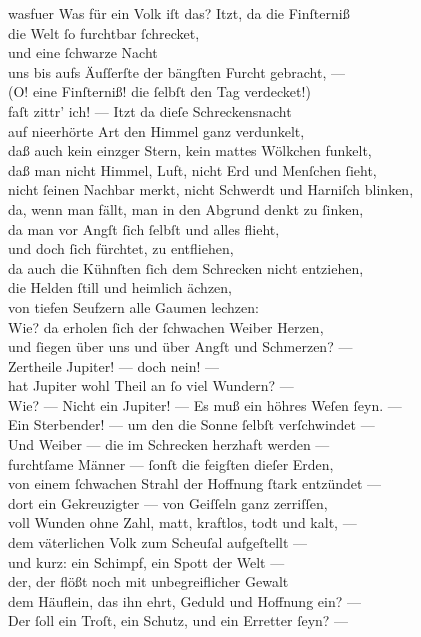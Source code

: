 \documentclass[shorttitlesize=50,tocstyle=ref-genre]{ees}
\begin{document}
{  \begin{movement}{wasfuer}
    Was für ein Volk iſt das? Itzt, da die Finſterniß\\
    die Welt ſo furchtbar ſchrecket,\\
    und eine ſchwarze Nacht\\
    uns bis aufs Äuſſerſte der bängſten Furcht gebracht, —\\
    (O! eine Finſterniß! die ſelbſt den Tag verdecket!)\\
    faſt zittr’ ich! — Itzt da dieſe Schreckensnacht\\
    auf nieerhörte Art den Himmel ganz verdunkelt,\\
    daß auch kein einzger Stern, kein mattes Wölkchen funkelt,\\
    daß man nicht Himmel, Luft, nicht Erd und Menſchen ſieht,\\
    nicht ſeinen Nachbar merkt, nicht Schwerdt und Harniſch blinken,\\
    da, wenn man fällt, man in den Abgrund denkt zu ſinken,\\
    da man vor Angſt ſich ſelbſt und alles flieht,\\
    und doch ſich fürchtet, zu entfliehen,\\
    da auch die Kühnſten ſich dem Schrecken nicht entziehen,\\
    die Helden ſtill und heimlich ächzen,\\
    von tiefen Seufzern alle Gaumen lechzen:\\
    Wie? da erholen ſich der ſchwachen Weiber Herzen,\\
    und ſiegen über uns und über Angſt und Schmerzen? —\\
    Zertheile Jupiter! — doch nein! —\\
    hat Jupiter wohl Theil an ſo viel Wundern? —\\
    Wie? — Nicht ein Jupiter! — Es muß ein höhres Weſen ſeyn. —\\
    Ein Sterbender! — um den die Sonne ſelbſt verſchwindet —\\
    Und Weiber — die im Schrecken herzhaft werden —\\
    furchtſame Männer — ſonſt die feigſten dieſer Erden,\\
    von einem ſchwachen Strahl der Hoffnung ſtark entzündet —\\
    dort ein Gekreuzigter — von Geiſſeln ganz zerriſſen,\\
    voll Wunden ohne Zahl, matt, kraftlos, todt und kalt, —\\
    dem väterlichen Volk zum Scheuſal aufgeſtellt —\\
    und kurz: ein Schimpf, ein Spott der Welt —\\
    der, der flößt noch mit unbegreiflicher Gewalt\\
    dem Häuflein, das ihn ehrt, Geduld und Hoffnung ein? —\\
    Der ſoll ein Troſt, ein Schutz, und ein Erretter ſeyn? —
  \end{movement}

}
\end{document}
